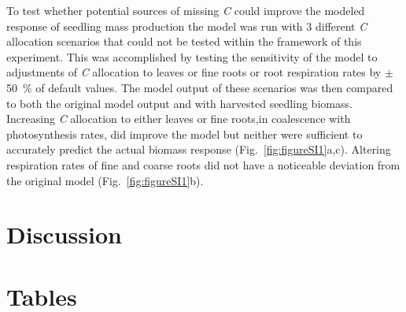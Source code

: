 \documentclass[a4paper]{article}\usepackage[]{graphicx}\usepackage[]{color}
\begin{document}
To test whether potential sources of missing \textit{C} could improve the modeled response of seedling mass production the model was run with 3 different \textit{C} allocation scenarios that could not be tested within the framework of this experiment. This was accomplished by testing the sensitivity of the model to adjustments of \textit{C} allocation to leaves or fine roots or root respiration rates by $\pm$50~\% of default values. The model output of these scenarios was then compared to both the original model output and with harvested seedling biomass.  Increasing \textit{C} allocation to either leaves or fine roots,in coalescence with photosynthesis rates, did improve the model but neither were sufficient to accurately predict the actual biomass response  (Fig.~\ref{fig:figureSI1}a,c). Altering respiration rates of fine and coarse roots did not have a noticeable deviation from the original model (Fig.~\ref{fig:figureSI1}b).

\section*{Discussion}


\section*{Tables}
\end{document}

